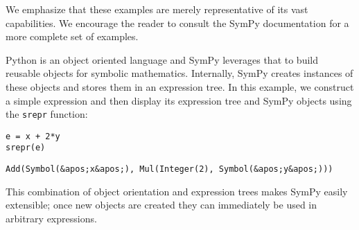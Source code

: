 We emphasize that these examples are merely representative of its vast
capabilities. We encourage the reader to consult the SymPy documentation for a
more complete set of examples.

Python is an object oriented language and SymPy leverages that to build reusable
objects for symbolic mathematics. Internally, SymPy creates instances of these
objects and stores them in an expression tree. In this example, we construct a
simple expression and then display its expression tree and SymPy objects using
the \verb:srepr: function:

\begin{verbatim}
e = x + 2*y
srepr(e)
\end{verbatim}

\begin{verbatim}
Add(Symbol(&apos;x&apos;), Mul(Integer(2), Symbol(&apos;y&apos;)))
\end{verbatim}

This combination of object orientation and expression trees makes SymPy easily
extensible; once new objects are created they can immediately be used in
arbitrary expressions.

